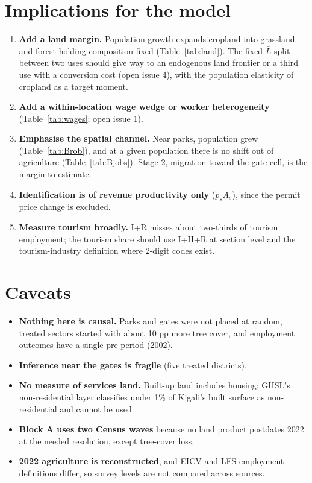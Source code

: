 \documentclass[11pt]{article}
\begin{document}
\section{Implications for the model}
\begin{enumerate}
\item \textbf{Add a land margin.} Population growth expands cropland into grassland and forest holding composition fixed (Table~\ref{tab:land}). The fixed $\bar L$ split between two uses should give way to an endogenous land frontier or a third use with a conversion cost (open issue 4), with the population elasticity of cropland as a target moment.
\item \textbf{Add a within-location wage wedge or worker heterogeneity} (Table~\ref{tab:wages}; open issue 1).
\item \textbf{Emphasise the spatial channel.} Near parks, population grew (Table~\ref{tab:Brob}), and at a given population there is no shift out of agriculture (Table~\ref{tab:Bjobs}). Stage 2, migration toward the gate cell, is the margin to estimate.
\item \textbf{Identification is of revenue productivity only} ($p_sA_s$), since the permit price change is excluded.
\item \textbf{Measure tourism broadly.} I+R misses about two-thirds of tourism employment; the tourism share should use I+H+R at section level and the tourism-industry definition where 2-digit codes exist.
\end{enumerate}

\section{Caveats}
\begin{itemize}
\item \textbf{Nothing here is causal.} Parks and gates were not placed at random, treated sectors started with about 10 pp more tree cover, and employment outcomes have a single pre-period (2002).
\item \textbf{Inference near the gates is fragile} (five treated districts).
\item \textbf{No measure of services land.} Built-up land includes housing; GHSL's non-residential layer classifies under 1\% of Kigali's built surface as non-residential and cannot be used.
\item \textbf{Block A uses two Census waves} because no land product postdates 2022 at the needed resolution, except tree-cover loss.
\item \textbf{2022 agriculture is reconstructed}, and EICV and LFS employment definitions differ, so survey levels are not compared across sources.
\end{itemize}
\end{document}
